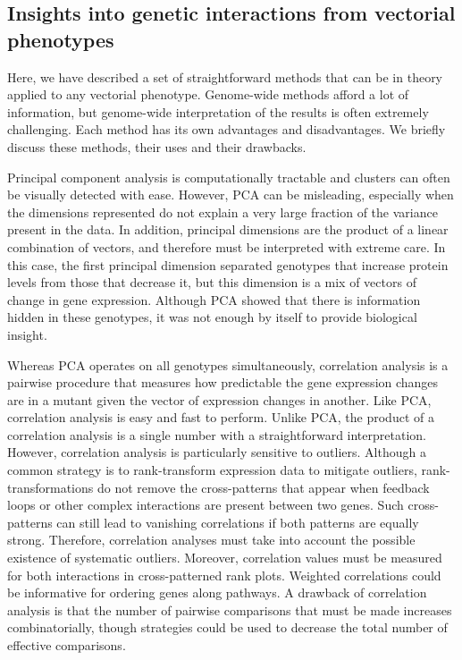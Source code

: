 \subsection*{Insights into genetic interactions from vectorial phenotypes}

Here, we have described a set of straightforward methods that can be in theory
applied to any vectorial phenotype. Genome-wide methods afford a lot of information,
but genome-wide interpretation of the results is often extremely challenging.
Each method has its own advantages and disadvantages. We briefly discuss these
methods, their uses and their drawbacks.

Principal component analysis
is computationally tractable and clusters can often be visually detected with
ease. However, PCA can be misleading, especially when the dimensions represented
do not explain a very large fraction of the variance present in the data. In addition,
principal dimensions are the product of a linear combination of vectors, and therefore
must be interpreted with extreme care. In this case, the first principal dimension
separated genotypes that increase \hifp{} protein levels from those that decrease
it, but this dimension is a mix of vectors of change in gene expression. Although
PCA showed that there is information hidden in these genotypes, it was not enough
by itself to provide biological insight.

Whereas PCA operates on all genotypes simultaneously, correlation analysis is a
pairwise procedure that measures how predictable the gene
expression changes are in a mutant given the vector of expression changes in
another. Like PCA, correlation analysis is easy and fast to perform. Unlike PCA,
the product of a correlation analysis is a single number with a straightforward
interpretation. However, correlation analysis is particularly sensitive to outliers.
Although a common strategy is to rank-transform expression data to mitigate
outliers, rank-transformations do not remove the cross-patterns that appear when
feedback loops or other complex interactions are present between two genes.
Such cross-patterns can still lead to vanishing correlations if both patterns are
equally strong. Therefore, correlation analyses must take into account the possible
existence of systematic outliers. Moreover, correlation values must be measured
for both interactions in cross-patterned rank plots. Weighted correlations could
be informative for ordering genes along pathways.
A drawback of correlation
analysis is that the number of pairwise comparisons that must be made increases
combinatorially, though strategies could be used to decrease the total number of
effective comparisons.

